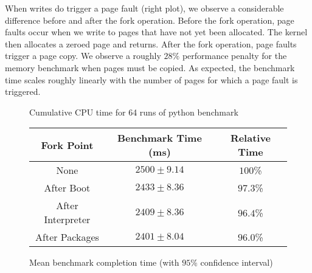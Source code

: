 When writes do trigger a page fault (right plot), we observe a considerable
difference before and after the fork operation. Before the fork operation, page
faults occur when we write to pages that have not yet been allocated. The
kernel then allocates a zeroed page and returns. After the fork operation, page
faults trigger a page copy. We observe a roughly $28\%$ performance penalty for
the memory benchmark when pages must be copied. As expected, the benchmark time
scales roughly linearly with the number of pages for which a page fault is
triggered.


\pgfplotsset{compat=1.5}
\begin{figure*}[t]
  \center
  \label{fig:pybench}
\caption{Cumulative CPU time for 64 runs of python benchmark}
\label{fig:pycpu}
\end{figure*}

\begin{figure*}
  \center
  \begin{tabular}{|c|c|c|}
    \hline
    Fork Point & Benchmark Time (ms) & Relative Time \\ \hline
    None & $2500 \pm 9.14$ & $100$\% \\ \hline
    After Boot & $2433 \pm 8.36$ & $97.3$\% \\ \hline
    After Interpreter & $2409 \pm 8.36$ & $96.4$\% \\ \hline
    After Packages & $2401 \pm 8.04$ & $96.0$\% \\ \hline
  \end{tabular}

  \caption{Mean benchmark completion time (with $95$\% confidence interval)}
  \label{fig:pybench}
\end{figure*}


